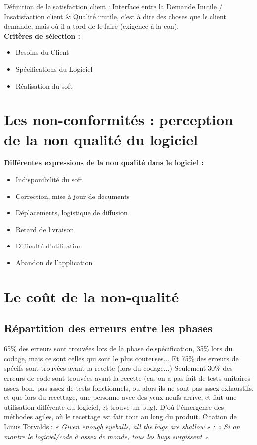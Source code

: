 Définition de la satisfaction client : Interface entre la Demande Inutile / Insatisfaction client \& Qualité inutile, c’est à dire des choses que le client demande, mais où il a tord de le faire (exigence à la con).\\

	\textbf{Critères de sélection  :}\hfill\\
	\begin{itemize}
		\item Besoins du Client
		\item Spécifications du Logiciel
		\item Réalisation du soft
	\end{itemize}


\section{Les non-conformités : perception de la non qualité du logiciel}

\textbf{Différentes expressions de la non qualité dans le logiciel :}\hfill\\

\begin{itemize}
    \item Indisponibilité du soft
    \item Correction, mise à jour de documents
    \item Déplacements, logistique de diffusion
    \item Retard de livraison
    \item Difficulté d’utilisation
    \item Abandon de l’application
\end{itemize}




\section{Le coût de la non-qualité}

	\subsection{Répartition des erreurs entre les phases}



65\% des erreurs sont trouvées lors de la phase de spécification, 35\% lors du codage, mais ce sont celles qui sont le plus couteuses...
Et  75\% des erreurs de spécifs sont trouvées avant la recette (lors du codage...)
Seulement 30\% des erreurs de code sont trouvées avant la recette (car on a pas fait de tests unitaires assez bon, pas assez de tests fonctionnels, ou alors ils ne sont pas assez exhaustifs, et que lors du recettage, une personne avec des yeux neufs arrive, et fait une utilisation différente du logiciel, et trouve un bug). D’où l'émergence des méthodes agiles, où le recettage est fait tout au long du produit. Citation de Linus Torvalds : \textit{« Given enough eyeballs, all the bugs are shallow » : « Si on montre le logiciel/code à assez de monde, tous les bugs surgissent »}.

